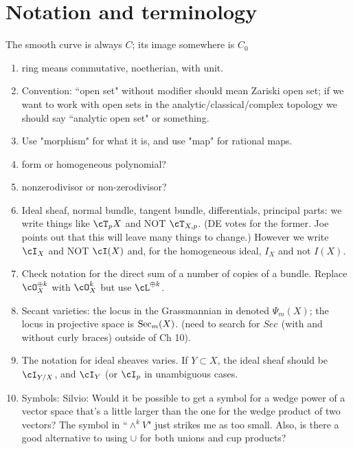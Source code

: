 \documentclass[12pt, leqno]{book}
\begin{document}
\section{Notation and terminology}

The smooth curve is always $C$; its image somewhere is $C_0$
\begin{enumerate}
\item ring means commutative, noetherian, with unit.
\item Convention: ``open set" without modifier should mean Zariski open set; if we want to work with open sets in the analytic/classical/complex topology we should say ``analytic open set" or something.

\item Use "morphism" for what it is, and use "map" for rational maps.

 \item form or homogeneous polynomial?
 \item nonzerodivisor or non-zerodivisor?

\item Ideal sheaf, normal bundle, tangent bundle, differentials, principal parts: we write things like 
$\cT_{p}X$ and NOT $\cT_{X,p}$.  (DE votes for the former. Joe points out that
this will leave many things to change.) However  we write $\cI_{X}$ and NOT $\cI(X)$ and, for the homogeneous
ideal, $I_{X}$ and not $I(X)$.

\item Check notation for the direct sum of a number of copies of a bundle. Replace $\cO_{X}^{\oplus k}$ with $\cO_{X}^{k}$ but use 
$\cL^{\oplus k}$.

\item Secant varieties: the locus in the Grassmannian in denoted $\Psi_m(X)$; the locus in projective space is $\Sec_m(X)$. (need to search for $Sec_{}$ (with and without curly braces) outside of Ch 10).

\item The notation for ideal sheaves varies. If $Y \subset X$,  the ideal sheaf should be $\cI_{Y/X}$, and $\cI_{Y}$ (or $\cI_{p}$ in unambiguous cases.

\item Symbols: Silvio: Would it be possible to get a symbol for a wedge power of a vector space that's a little larger than the one for the wedge product of two vectors? The symbol in ``$\wedge^k V$" just strikes me as too small. Also, is there a good alternative to using $\cup$ for both unions and cup products?


\end{enumerate}
\end{document}
